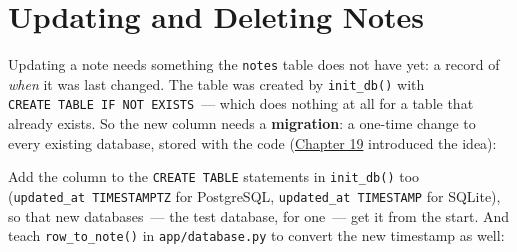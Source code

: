 \setcounter{section}{8}
\section{Updating and Deleting Notes}\label{33-logic-execution:339-updating-and-deleting-notes}

Updating a note needs something the \texttt{notes} table does not have yet: a record of \emph{when} it was last changed. The table was created by \texttt{init\_db()} with \texttt{CREATE\ TABLE\ IF\ NOT\ EXISTS}~--- which does nothing at all for a table that already exists. So the new column needs a \textbf{migration}: a one-time change to every existing database, stored with the code (\hyperref[ch:19-artifact-storage]{Chapter 19} introduced the idea):

\begin{codebox}[short]

\begin{Shaded}
\begin{Highlighting}[]
  
\end{Highlighting}
\end{Shaded}

\end{codebox}

\begin{codebox}[short]

\begin{Shaded}
\begin{Highlighting}[]
  
\end{Highlighting}
\end{Shaded}

\end{codebox}

\noindent{}Add the column to the \texttt{CREATE\ TABLE} statements in \texttt{init\_db()} too (\texttt{updated\_at\ TIMESTAMPTZ} for PostgreSQL, \texttt{updated\_at\ TIMESTAMP} for SQLite), so that new databases~--- the test database, for one~--- get it from the start. And teach \texttt{row\_to\_note()} in \texttt{app/database.py} to convert the new timestamp as well:

